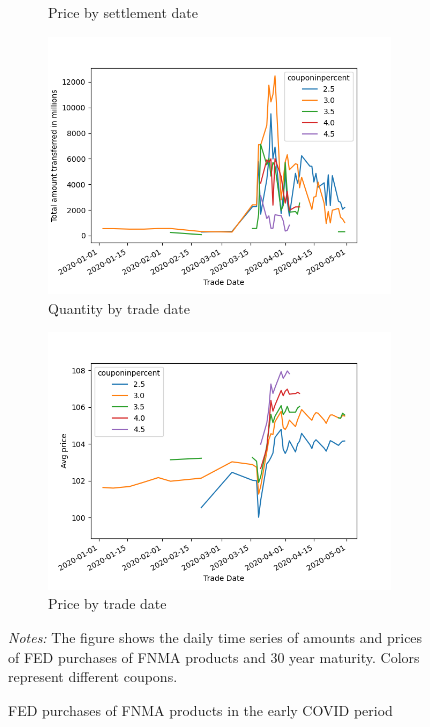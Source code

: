 \documentclass[11pt,a4paper]{article}
\begin{document}
\begin{figure}[h]
\begin{subfigure}[b]{0.49\textwidth}
        \caption{ Price by settlement date}
       \end{subfigure}
       \begin{subfigure}[b]{0.49\textwidth}
        \includegraphics[width=0.998\textwidth]{../results/figures/FNMA_daily_purchases_tradedate_amount.png}
        \caption{ Quantity by trade date}
       \end{subfigure}
       \begin{subfigure}[b]{0.49\textwidth}
        \includegraphics[width=0.998\textwidth]{../results/figures/FNMA_daily_purchases_tradedate_price.png}
        \caption{ Price by trade date}
       \end{subfigure}
     \caption{FED purchases of FNMA products in the early COVID period} 
     \begin{minipage}{\textwidth}
        \footnotesize{\textit{Notes:} The figure shows the daily time series of amounts and  prices of FED purchases of FNMA products and 30 year maturity. Colors represent different coupons. } 
        \end{minipage}
\end{figure}
\end{document}
